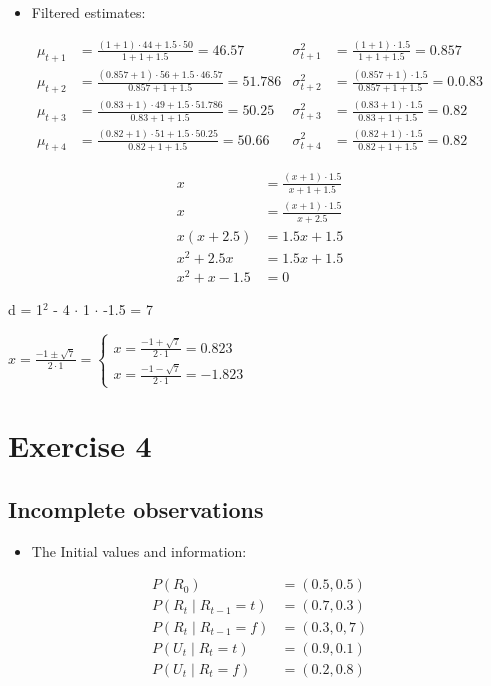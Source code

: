\documentclass[colorlinks=true,linkcolor=blue]{article}
\begin{document}
\begin{itemize}
\item Filtered estimates:
\end{itemize}
\begin{align*}
\mu_{t+1} &= \frac{(1+1) \cdot 44 + 1.5 \cdot 50}{1 + 1 + 1.5} = 46.57 & \sigma^2_{t+1} &= \frac{(1+1) \cdot 1.5}{1 + 1 + 1.5} = 0.857 \\
\mu_{t+2} &= \frac{(0.857+1) \cdot 56 + 1.5 \cdot 46.57}{0.857 + 1 + 1.5} = 51.786 & \sigma^2_{t+2} &= \frac{(0.857+1) \cdot 1.5}{0.857 + 1 + 1.5} = 0.0.83\\
\mu_{t+3} &= \frac{(0.83+1) \cdot 49 + 1.5 \cdot 51.786}{0.83 + 1 + 1.5} = 50.25 & \sigma^2_{t+3} &= \frac{(0.83+1) \cdot 1.5}{0.83 + 1 + 1.5} = 0.82 \\
\mu_{t+4} &= \frac{(0.82+1) \cdot 51 + 1.5 \cdot 50.25}{0.82 + 1 + 1.5} = 50.66 & \sigma^2_{t+4} &= \frac{(0.82+1) \cdot 1.5}{0.82 + 1 + 1.5} = 0.82
\end{align*}

\begin{align*}
x &= \frac{(x+1) \cdot 1.5}{x+1+1.5}\\
x &= \frac{(x+1) \cdot 1.5}{x+2.5}\\
x(x+2.5) &= 1.5x + 1.5\\
x^2 + 2.5x &= 1.5x + 1.5\\
x^2+ x - 1.5 &= 0
\end{align*}

d = 1$^{\text{2}}$ - 4 $\cdot$ 1 $\cdot$ -1.5 = 7

$x = \frac{-1 \pm \sqrt{7}}{2 \cdot 1} = 
\begin{cases} x = \frac{-1 + \sqrt{7}}{2 \cdot 1} = 0.823\\
              x = \frac{-1 - \sqrt{7}}{2 \cdot 1} = -1.823
\end{cases}$

\section{Exercise 4}
\label{sec-4}
\subsection{Incomplete observations}
\label{sec-4-1}
\begin{itemize}
\item The Initial values and information:
\end{itemize}
\begin{align*}
  P(R_0) &= (0.5, 0.5)\\
  P(R_t \mid R_{t-1} = t) &= (0.7, 0.3)\\
  P(R_t \mid R_{t-1} = f) &= (0.3, 0,7)\\
  P(U_t \mid R_t = t) &= (0.9, 0.1)\\
  P(U_t \mid R_t = f) &= (0.2, 0.8)
\end{align*}
\end{document}
